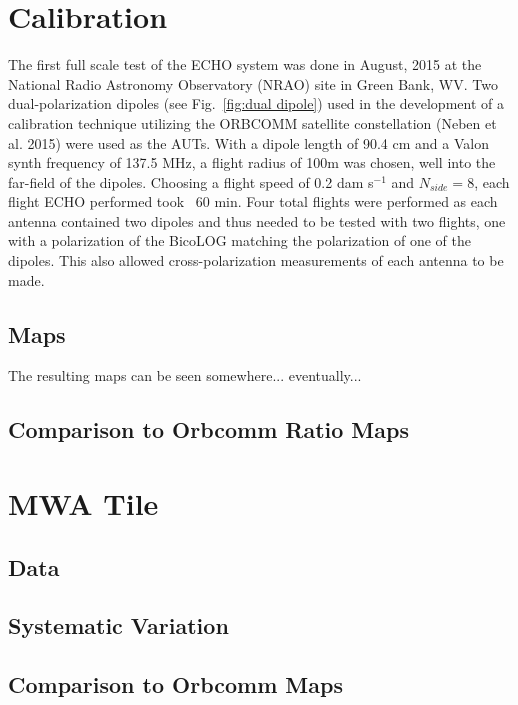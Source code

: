 \documentclass[preprint2,numberedappendix,tighten,twocolappendix]{aastex6}
\begin{document}
\cite{2005ApJ...622..759G}






\section{Calibration}

The first full scale test of the ECHO system was done in August, 2015 at the National Radio Astronomy Observatory (NRAO) site in Green Bank, WV.  Two dual-polarization dipoles (see Fig.~\ref{fig:dual dipole}) used in the development of a calibration technique utilizing the ORBCOMM satellite constellation (Neben et al. 2015) were used as the AUTs.  With a dipole length of 90.4 cm and a Valon synth frequency of 137.5 MHz, a flight radius of 100m was chosen, well into the far-field of the dipoles.  Choosing a flight speed of 0.2 dam s$^{-1}$ and $N_{side}=8$, each flight ECHO performed took ~60 min.  Four total flights were performed as each antenna contained two dipoles and thus needed to be tested with two flights, one with a polarization of the BicoLOG matching the polarization of one of the dipoles.  This also allowed cross-polarization measurements of each antenna to be made.


\subsection{Maps}

The resulting maps can be seen somewhere... eventually...

\subsection{Comparison to Orbcomm Ratio Maps}




\section{MWA Tile}

\subsection{Data}

\subsection{Systematic Variation}

\subsection{Comparison to Orbcomm Maps}
\end{document}
